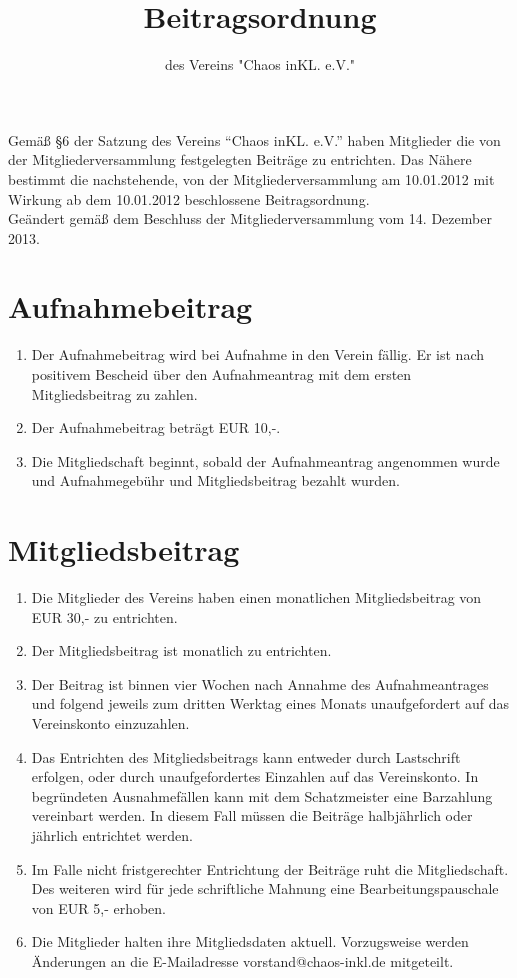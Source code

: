 \documentclass[a4paper, 12pt]{scrartcl}
\begin{document}
\title{Beitragsordnung}
\subtitle{des Vereins "Chaos inKL. e.V."}
\author{}
\date{}

\maketitle

\noindent Gemäß §6 der Satzung des Vereins "`Chaos inKL. e.V."'
haben Mitglieder die von der Mitgliederversammlung
festgelegten Beiträge zu entrichten. Das Nähere bestimmt die
nachstehende, von der Mitgliederversammlung am 10.01.2012 mit Wirkung ab
dem 10.01.2012 beschlossene Beitragsordnung. \\[0.5cm]
Geändert gemäß dem Beschluss der Mitgliederversammlung vom 14. Dezember 2013.

\section{Aufnahmebeitrag}
\begin{enumerate}
	\item Der Aufnahmebeitrag wird bei Aufnahme in den Verein fällig. Er ist nach positivem Bescheid über den Aufnahmeantrag mit dem ersten Mitgliedsbeitrag zu zahlen.
	\item Der Aufnahmebeitrag beträgt EUR 10,-.
	\item Die Mitgliedschaft beginnt, sobald der Aufnahmeantrag angenommen wurde und Aufnahmegebühr und Mitgliedsbeitrag bezahlt wurden.
\end{enumerate}

\section{Mitgliedsbeitrag}
\begin{enumerate}
	\item Die Mitglieder des Vereins haben einen monatlichen
    Mitgliedsbeitrag von EUR 30,- zu entrichten.
	\item Der Mitgliedsbeitrag ist monatlich zu entrichten.
	\item Der Beitrag ist binnen vier Wochen nach Annahme des Aufnahmeantrages und folgend jeweils zum dritten Werktag eines Monats unaufgefordert auf das Vereinskonto einzuzahlen.
	\item Das Entrichten des Mitgliedsbeitrags kann entweder durch Lastschrift erfolgen, oder durch unaufgefordertes Einzahlen auf das Vereinskonto. In begründeten Ausnahmefällen kann mit dem Schatzmeister eine Barzahlung vereinbart werden. In diesem Fall müssen die Beiträge halbjährlich oder jährlich entrichtet werden.
	\item Im Falle nicht fristgerechter Entrichtung der Beiträge ruht die Mitgliedschaft. Des weiteren wird für jede schriftliche Mahnung eine Bearbeitungspauschale von EUR 5,- erhoben.
	\item Die Mitglieder halten ihre Mitgliedsdaten aktuell. Vorzugsweise
    werden Änderungen an die E-Mailadresse
    vorstand@chaos-inkl.de mitgeteilt. 
\end{enumerate}
\end{document}
